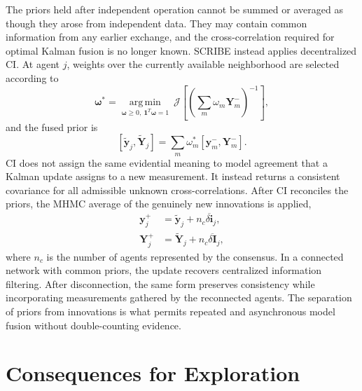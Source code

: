 \documentclass[letterpaper,10pt,conference]{ieeeconf}
\begin{document}
The priors held after independent operation cannot be summed or averaged as
though they arose from independent data. They may contain common information
from any earlier exchange, and the cross-correlation required for optimal
Kalman fusion is no longer known. SCRIBE instead applies decentralized CI.
At agent $j$, weights over the currently available neighborhood are selected
according to
\begin{equation}
    \bm{\omega}^{*}
    =\underset{\bm{\omega}\geq 0,\ \bm{1}^{T}\bm{\omega}=1}
      {\operatorname{arg\,min}}\ 
      \mathcal{J}\left[
      \left(\sum_{m}\omega_m\bm{Y}_m^{-}\right)^{-1}
      \right],
    \label{eq:ci-objective}
\end{equation}
and the fused prior is
\begin{equation}
    \left[\widetilde{\bm{y}}_j,\widetilde{\bm{Y}}_j\right]
    =\sum_m\omega_m^{*}
      \left[\bm{y}_m^{-},\bm{Y}_m^{-}\right].
    \label{eq:ci-fusion}
\end{equation}
CI does not assign the same evidential meaning to model agreement that a
Kalman update assigns to a new measurement. It instead returns a consistent
covariance for all admissible unknown cross-correlations. After CI reconciles
the priors, the MHMC average of the genuinely new innovations is applied,
\begin{align}
    \bm{y}_j^{+}
    &=\widetilde{\bm{y}}_j+n_c\overline{\delta\bm{i}}_j,\\
    \bm{Y}_j^{+}
    &=\widetilde{\bm{Y}}_j+n_c\overline{\delta\bm{I}}_j,
    \label{eq:hybrid-update}
\end{align}
where $n_c$ is the number of agents represented by the consensus. In a
connected network with common priors, the update recovers centralized
information filtering. After disconnection, the same form preserves
consistency while incorporating measurements gathered by the reconnected
agents. The separation of priors from innovations is what permits repeated
and asynchronous model fusion without double-counting evidence.

\section{Consequences for Exploration}
\end{document}
